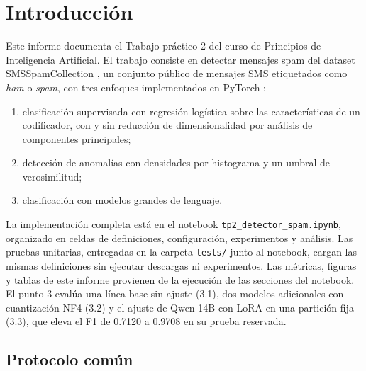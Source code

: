 \section{Introducción}

Este informe documenta el Trabajo práctico 2 del curso de Principios de
Inteligencia Artificial. El trabajo consiste en detectar mensajes spam del
dataset SMSSpamCollection \cite{almeida2011sms,uci_sms_spam}, un conjunto
público de mensajes SMS etiquetados como \emph{ham} o \emph{spam}, con tres
enfoques implementados en PyTorch \cite{paszke2019pytorch}:

\begin{enumerate}
    \item clasificación supervisada con regresión logística sobre las
    características de un codificador, con y sin reducción de
    dimensionalidad por análisis de componentes principales;
    \item detección de anomalías con densidades por histograma y un umbral
    de verosimilitud;
    \item clasificación con modelos grandes de lenguaje.
\end{enumerate}

La implementación completa está en el notebook
\texttt{tp2\_detector\_spam.ipynb}, organizado en celdas de definiciones,
configuración, experimentos y análisis. Las pruebas unitarias, entregadas
en la carpeta \texttt{tests/} junto al notebook, cargan las mismas
definiciones sin ejecutar descargas ni experimentos. Las métricas, figuras y
tablas de este informe provienen de la ejecución de las secciones del
notebook. El punto 3 evalúa una línea base sin ajuste (3.1), dos modelos
adicionales con cuantización NF4 (3.2) y el ajuste de Qwen 14B con LoRA en
una partición fija (3.3), que eleva el F1 de 0.7120 a 0.9708 en su prueba
reservada.

\subsection{Protocolo común}

